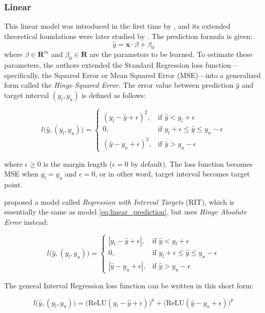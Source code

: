 \documentclass[12pt]{article}
\begin{document}
\subsubsection{Linear}
This linear model was introduced in the first time by \citet{rigaill:13}, and its extended theoretical foundations were later studied by \citet{rit}.
The prediction formula is given:
\begin{equation}
    \hat{y} = \mathbf{x} \cdot \beta + \beta_0
\end{equation}
where $\beta \in \mathbf{R}^m$ and $\beta_0 \in \mathbf{R}$ are the parameters to be learned. To estimate these parameters, the authors extended the Standard Regression loss function—specifically, the Squared Error or Mean Squared Error (MSE)—into a generalized form called the \textit{Hinge Squared Error}.
The error value between prediction $\hat{y}$ and target interval $(y_l, y_u)$ is defined as follows: 

$$l\Big(\hat{y}, (y_l, y_u)\Big) = 
\begin{cases} 
    (y_l - \hat{y} + \epsilon)^2, & \mbox{if } \hat{y} < y_l + \epsilon \\
    0, & \mbox{if } y_l + \epsilon \leq \hat{y} \leq y_u - \epsilon \\
    (\hat{y} - y_u + \epsilon)^2, & \mbox{if } \hat{y} > y_u - \epsilon
\end{cases}$$

\noindent where $\epsilon \geq 0$ is the margin length ($\epsilon=0$ by default).
The loss function becomes MSE when $y_l = y_u$ and $\epsilon = 0$, or in other word, target interval becomes target point.

\citet{rit} proposed a model called \textit{Regression with Interval Targets} (RIT), which is essentially the same as model \eqref{eq:linear_prediction}, but uses \textit{Hinge Absolute Error} instead:

$$l\Big(\hat{y}, (y_l, y_u)\Big) = 
\begin{cases} 
    |y_l - \hat{y} + \epsilon|, & \mbox{if } \hat{y} < y_l + \epsilon \\
    0, & \mbox{if } y_l + \epsilon \leq \hat{y} \leq y_u - \epsilon \\
    |\hat{y} - y_u + \epsilon|, & \mbox{if } \hat{y} > y_u - \epsilon
\end{cases}$$

\noindent The general Interval Regression loss function can be written in this short form:

\begin{equation}
    l\Big(\hat{y}, (y_l, y_u)\Big) = \Big( \text{ReLU}(y_l - \hat{y} + \epsilon)\Big)^p + \Big(\text{ReLU}(\hat{y} - y_u + \epsilon) \Big)^p
\end{equation}
\end{document}

